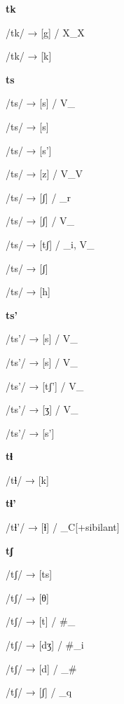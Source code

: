 \begin{center}\textbf{tk}\end{center}
\begin{multicols}{4}
\noindent /tk/ → [g] / X\_X

\noindent /tk/ → [k]

\end{multicols}

\begin{center}\textbf{ts}\end{center}
\begin{multicols}{4}
\noindent /ts/ → [s] / V\_

\noindent /ts/ → [s]

\noindent /ts/ → [s']

\noindent /ts/ → [z] / V\_V

\noindent /ts/ → [ʃ] / \_r

\noindent /ts/ → [ʃ] / V\_

\noindent /ts/ → [tʃ] / \_i, V\_

\noindent /ts/ → [ʃ]

\noindent /ts/ → [h]
\end{multicols}

\begin{center}\textbf{ts'}\end{center}
\begin{multicols}{4}
\noindent /ts'/ → [s] / V\_

\noindent /ts'/ → [s] / V\_

\noindent /ts'/ → [tʃ'] / V\_

\noindent /ts'/ → [ʒ] / V\_

\noindent /ts'/ → [s']
\end{multicols}

\begin{center}\textbf{tɬ}\end{center}
\begin{multicols}{4}
\noindent /tɬ/ → [k]
\end{multicols}


\begin{center}\textbf{tɬ'}\end{center}
\begin{multicols}{4}
\noindent /tɬ'/ → [ɬ] / \_C[+sibilant]
\end{multicols}


\begin{center}\textbf{tʃ}\end{center}
\begin{multicols}{4}
\noindent /tʃ/ → [ts]

\noindent /tʃ/ → [θ]

\noindent /tʃ/ → [t] / \#\_

\noindent /tʃ/ → [dʒ] / \#\_i

\noindent /tʃ/ → [d] / \_\#

\noindent /tʃ/ → [ʃ] / \_q

\end{multicols}

